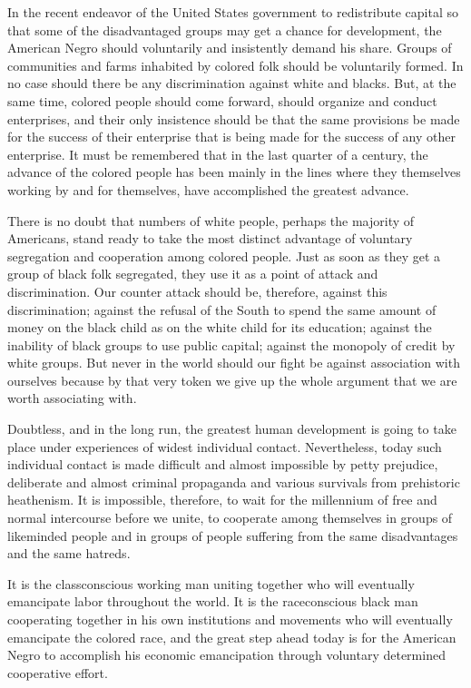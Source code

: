 \documentclass[letterpaper,10pt,english]{jupyterBook}
\begin{document}
\sphinxAtStartPar
In the recent endeavor of the United States government to redistribute capital so that some of the disadvantaged groups may get a chance for development, the American Negro should voluntarily and insistently demand his share. Groups of communities and farms inhabited by colored folk should be voluntarily formed. In no case should there be any discrimination against white and blacks. But, at the same time, colored people should come forward, should organize and conduct enterprises, and their only insistence should be that the same provisions be made for the success of their enterprise that is being made for the success of any other enterprise. It must be remembered that in the last quarter of a century, the advance of the colored people has been mainly in the lines where they themselves working by and for themselves, have accomplished the greatest advance.

\sphinxAtStartPar
There is no doubt that numbers of white people, perhaps the majority of Americans, stand ready to take the most distinct advantage of voluntary segregation and cooperation among colored people. Just as soon as they get a group of black folk segregated, they use it as a point of attack and discrimination. Our counter attack should be, therefore, against this discrimination; against the refusal of the South to spend the same amount of money on the black child as on the white child for its education; against the inability of black groups to use public capital; against the monopoly of credit by white groups. But never in the world should our fight be against association with ourselves because by that very token we give up the whole argument that we are worth associating with.

\sphinxAtStartPar
Doubtless, and in the long run, the greatest human development is going to take place under experiences of widest individual contact. Nevertheless, today such individual contact is made difficult and almost impossible by petty prejudice, deliberate and almost criminal propaganda and various survivals from prehistoric heathenism. It is impossible, therefore, to wait for the millennium of free and normal intercourse before we unite, to cooperate among themselves in groups of like\sphinxhyphen{}minded people and in groups of people suffering from the same disadvantages and the same hatreds.

\sphinxAtStartPar
It is the class\sphinxhyphen{}conscious working man uniting together who will eventually emancipate labor throughout the world. It is the race\sphinxhyphen{}conscious black man cooperating together in his own institutions and movements who will eventually emancipate the colored race, and the great step ahead today is for the American Negro to accomplish his economic emancipation through voluntary determined cooperative effort.
\end{document}
